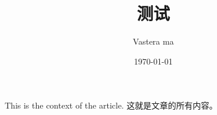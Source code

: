 \documentclass[UTF8]{ctexart}
\title{测试}
\author{Vastera ma}
\date{\today}
\begin{document}
    \maketitle
    
    This is the context of the article.
    这就是文章的所有内容。
    ​
    
\end{document}
